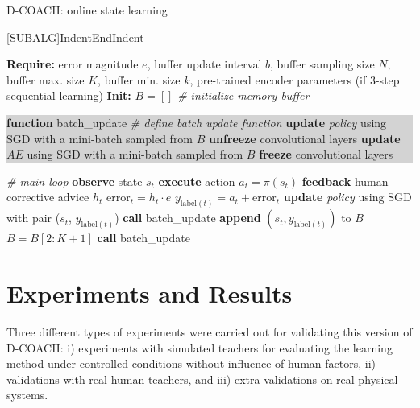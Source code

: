 \begin{algorithm}[h]
\caption{D-COACH: online state learning}\label{algorithm:EnDeepCOACH}
\begin{algorithmic}[1]
[SUBALG]{Indent}{EndIndent}{}{\algorithmicend\ }%

\State \textbf{Require:} error magnitude $\textit{e}$, buffer update interval $b$, buffer sampling size $N$, buffer max. size $K$, buffer min. size $k$, pre-trained encoder parameters (if 3-step sequential learning) 
\State \textbf{Init:} $B = []$ \emph{\# initialize memory buffer}

\colorbox{lightgray}
{\parbox{\linewidth}{\State \textbf{function} batch\_update \emph{\# define batch update function}
\Indent
{}
\State \textbf{update} \emph{policy} using SGD with a mini-batch sampled from $B$
\State \textbf{unfreeze} convolutional layers
\State \textbf{update} $AE$ using SGD with a mini-batch sampled from $B$
\Else
\State \textbf{freeze} convolutional layers
\EndIndent
\EndIf
\EndIf
}}
\colorbox{lightlightgray}{\parbox{\linewidth}{%
 \emph{\# main loop}
\State \textbf{observe} state $s_{t}$
\State \textbf{execute} action $a_{t}=\pi(s_{t})$
\State \textbf{feedback} human corrective advice $h_{t}$
\State $\mathrm{error}_{t} = h_{t}\cdot e$
\State $y_{\mathrm{label}(t)} = a_{t} + \mathrm{error}_{t}$ 
\State \textbf{update} \emph{policy} using SGD with pair ($s_{t}$, $y_{\mathrm{label}(t)}$) 
\State \textbf{call} batch\_update
\EndIf
\State \textbf{append} $(s_{t}, y_{\mathrm{label}(t)})$ to $B$
\State $B = B[2:K+1]$
\EndIf
{}
\State \textbf{call} batch\_update
\EndIf
\EndFor}}
\end{algorithmic}
\end{algorithm}

\section{Experiments and Results}

Three different types of experiments were carried out for validating this version of D-COACH: i) experiments with simulated teachers for evaluating the learning method under controlled conditions without influence of human factors, ii) validations with real human teachers, and iii) extra validations on real physical systems.

